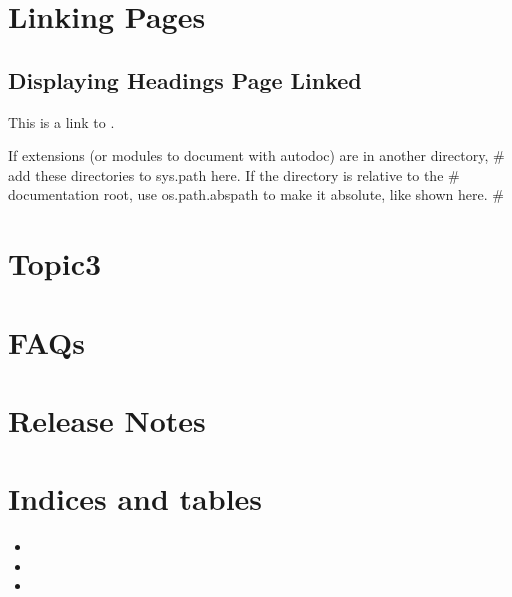 \documentclass[letterpaper,10pt,english]{sphinxmanual}
\begin{document}
\sphinxstepscope


\chapter{Linking Pages}
\label{\detokenize{topic3:linking-pages}}\label{\detokenize{topic3::doc}}

\section{Displaying Headings Page Linked}
\label{\detokenize{topic3:displaying-headings-page-linked}}
\sphinxAtStartPar
This is a link to {\hyperref[\detokenize{topic1::doc}]{}}.

\sphinxAtStartPar
If extensions (or modules to document with autodoc) are in another directory,
\# add these directories to sys.path here. If the directory is relative to the
\# documentation root, use os.path.abspath to make it absolute, like shown here.
\#

\sphinxstepscope


\chapter{Topic3}
\label{\detokenize{topic4:topic3}}\label{\detokenize{topic4::doc}}
\sphinxstepscope


\chapter{FAQs}
\label{\detokenize{FAQs:faqs}}\label{\detokenize{FAQs::doc}}
\sphinxstepscope


\chapter{Release Notes}
\label{\detokenize{release_notes:release-notes}}\label{\detokenize{release_notes::doc}}

\chapter{Indices and tables}
\label{\detokenize{index:indices-and-tables}}\begin{itemize}
\item {} 
\sphinxAtStartPar
{}

\item {} 
\sphinxAtStartPar
{}

\item {} 
\sphinxAtStartPar
{}

\end{itemize}



\renewcommand{\indexname}{Index}
\printindex
\end{document}
